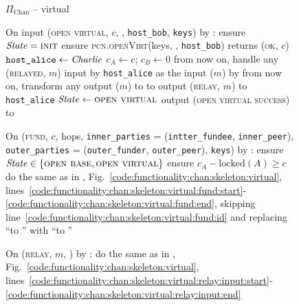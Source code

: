 \begin{figure}[H]
  \begin{protocolbox}{$\Pi_{\mathrm{Chan}}$ -- virtual}
    \begin{algorithmic}[1]
      \State {}
      \State {}
      \State On input (\textsc{open virtual}, $c$, \bob, \texttt{host\_bob},
      \texttt{keys}) by \charlie:
      \label{code:protocol:chan:skeleton:vchan:open-virtual}
      \Indent
        \State ensure $\mathit{State} = \textsc{init}$
        \State ensure \textsc{pcn.openVirt}(keys, \bob, \texttt{host\_bob})
        returns (\textsc{ok}, $c$)
        \label{code:protocol:chan:skeleton:vchan:ln}
        \State $\texttt{host\_alice} \gets \mathit{Charlie}$
        \State $c_A \gets c$; $c_B \gets 0$
        \State from now on, handle any (\textsc{relayed}, $m$) input by
        \texttt{host\_alice} as the input ($m$) by \environment
        \State from now on, transform any output ($m$) to \environment to
        output (\textsc{relay}, $m$) to \texttt{host\_alice}
        \State $\mathit{State} \gets \textsc{open virtual}$
        \State output (\textsc{open virtual success}) to \charlie
        \label{code:protocol:chan:skeleton:vchan:open-virtual:output}
      \EndIndent
      \Statex

      \State On (\textsc{fund}, $c$, hops, \texttt{inner\_parties} =
      (\texttt{intter\_fundee}, \texttt{inner\_peer}), \texttt{outer\_parties} =
      (\texttt{outer\_funder}, \texttt{outer\_peer}), \texttt{keys}) by
      \environment:
      \Indent
        \State ensure $\mathit{State} \in \{\textsc{open base}, \textsc{open
        virtual}\}$
        \State ensure $c_A - \mathrm{locked}(A) \geq c$
        \State do the same as in \fchan,
        Fig.~\ref{code:functionality:chan:skeleton:virtual},
        lines~\ref{code:functionality:chan:skeleton:virtual:fund:start}-\ref{code:functionality:chan:skeleton:virtual:fund:end},
        skipping line~\ref{code:functionality:chan:skeleton:virtual:fund:id} and
        replacing ``to \alice'' with ``to \environment''
        \label{code:protocol:chan:skeleton:vchan}
      \EndIndent
      \Statex

      \State On (\textsc{relay}, $m$, \charlie) by \environment:
      \Indent
        \State do the same as in \fchan,
        Fig.~\ref{code:functionality:chan:skeleton:virtual},
        lines~\ref{code:functionality:chan:skeleton:virtual:relay:input:start}-\ref{code:functionality:chan:skeleton:virtual:relay:input:end}
      \EndIndent
      \Statex


\end{algorithmic}
\end{protocolbox}
\end{figure}
